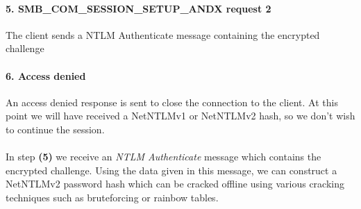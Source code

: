 \documentclass{article}
\begin{document}
\paragraph{5. SMB\_COM\_SESSION\_SETUP\_ANDX request 2} The client sends a NTLM Authenticate message containing the encrypted challenge
\paragraph{6. Access denied} An access denied response is sent to close the connection to the client. At this point we will have received a NetNTLMv1 or NetNTLMv2 hash, so we don't wish to continue the session.
\\\\
In step \textbf{(5)} we receive an \emph{NTLM Authenticate} message which contains the encrypted challenge. Using the data given in this message, we can construct a NetNTLMv2 password hash which can be cracked offline using various cracking techniques such as bruteforcing or rainbow tables.
\end{document}
